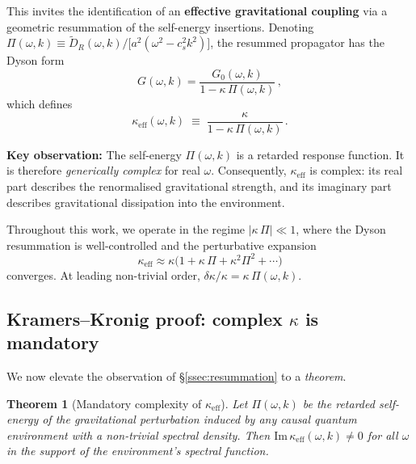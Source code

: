 \documentclass[12pt,a4paper]{article}
\newtheorem{theorem}{Theorem}
\begin{document}
This invites the identification of an \textbf{effective gravitational
coupling} via a geometric resummation of the self-energy insertions.
Denoting $\Pi(\omega,k)\equiv
\widetilde{D}_{R}(\omega,k)/\bigl[a^{2}(\omega^{2}-c_{s}^{2}k^{2})\bigr]$,
the resummed propagator has the Dyson form
\begin{equation}\label{eq:Dyson}
  G(\omega,k)
  = \frac{G_{0}(\omega,k)}{1-\kappa\,\Pi(\omega,k)}\,,
\end{equation}
which defines
\begin{equation}\label{eq:kappa-eff}
  \boxed{
  \kappa_{\mathrm{eff}}(\omega,k)
  \;\equiv\;
  \frac{\kappa}{1-\kappa\,\Pi(\omega,k)}\,.}
\end{equation}

\noindent
\textbf{Key observation:} The self-energy $\Pi(\omega,k)$ is a
retarded response function.  It is therefore \emph{generically complex}
for real $\omega$.  Consequently, $\kappa_{\mathrm{eff}}$ is complex:
its real part describes the renormalised gravitational strength, and
its imaginary part describes gravitational dissipation into the
environment.

\begin{remark}
Throughout this work, we operate in the regime
$|\kappa\,\Pi|\ll 1$, where the Dyson resummation is well-controlled
and the perturbative expansion
\begin{equation}\label{eq:kappa-pert}
  \kappa_{\mathrm{eff}}
  \approx \kappa\bigl(1+\kappa\,\Pi+\kappa^{2}\Pi^{2}+\cdots\bigr)
\end{equation}
converges.  At leading non-trivial order,
$\delta\kappa/\kappa=\kappa\,\Pi(\omega,k)$.
\end{remark}

\subsection{Kramers--Kronig proof: complex $\kappa$ is
  mandatory}\label{ssec:KK-proof}

We now elevate the observation of \S\ref{ssec:resummation} to a
\emph{theorem}.

\begin{theorem}[Mandatory complexity of $\kappa_{\mathrm{eff}}$]%
\label{thm:complex-kappa}
Let $\Pi(\omega,k)$ be the retarded self-energy of the gravitational
perturbation induced by \emph{any} causal quantum environment with a
non-trivial spectral density.  Then
$\mathrm{Im}\,\kappa_{\mathrm{eff}}(\omega,k)\neq 0$ for all
$\omega$ in the support of the environment's spectral function.
\end{theorem}
\end{document}
